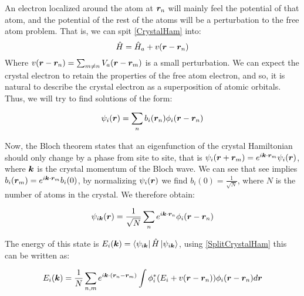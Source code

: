 An electron localized around the atom at $\boldsymbol{r}_n$ will mainly feel the potential of that atom, and the potential of the rest of the atoms will be a perturbation to the free atom problem. That is, we can spit \ref{CrystalHam} into:
\begin{equation}
\label{SplitCrystalHam}
\hat{H} = \hat{H}_a + v(\boldsymbol{r}-\boldsymbol{r}_n)
\end{equation}
Where $v(\boldsymbol{r}-\boldsymbol{r}_n) = \sum_{m \neq n} V_a(\boldsymbol{r}-\boldsymbol{r}_m)$ is a small perturbation. We can expect the crystal electron to retain the properties of the free atom electron, and so, it is natural to describe the crystal electron as a superposition of atomic orbitals. Thus, we will try to find solutions of the form:

\begin{equation}
\psi_i(\boldsymbol{r}) = \sum_n b_i(\boldsymbol{r}_n) \phi_i(\boldsymbol{r}-\boldsymbol{r}_n)
\end{equation}

Now, the Bloch theorem states that an eigenfunction of the crystal Hamiltonian should only change by a phase from site to site, that is $\psi_i(\boldsymbol{r}+\boldsymbol{r}_m)=e^{i \boldsymbol{k} \cdot \boldsymbol{r}_m}\psi_i(\boldsymbol{r})$, where $\boldsymbol{k}$ is the crystal momentum of the Bloch wave. We can see that see implies $b_i(\boldsymbol{r}_m) = e^{i \boldsymbol{k} \cdot \boldsymbol{r}_m}b_i(0)$, by normalizing $\psi_i(\boldsymbol{r})$ we find $b_i(0) = \frac{1}{\sqrt{N}}$, where $N$ is the number of atoms in the crystal. We therefore obtain:

\begin{equation}
\psi_{i\boldsymbol{k}}(\boldsymbol{r}) = \frac{1}{\sqrt{N}}\sum_n  e^{i \boldsymbol{k} \cdot \boldsymbol{r}_n} \phi_i(\boldsymbol{r}-\boldsymbol{r}_n)
\end{equation}

The energy of this state is $E_i(\boldsymbol{k}) = \bra{\psi_{i\boldsymbol{k}}} \hat{H} \ket{\psi_{i\boldsymbol{k}}}$, using \ref{SplitCrystalHam} this can be written as:

\begin{equation}
E_i(\boldsymbol{k}) = \frac{1}{N} \sum_{n,m} e^{i\boldsymbol{k}\cdot(\boldsymbol{r}_n-\boldsymbol{r}_m)} \int \phi_i^* (E_i+v(\boldsymbol{r}-\boldsymbol{r}_n)) \phi_i(\boldsymbol{r}-\boldsymbol{r}_n) d\boldsymbol{r}
\end{equation}








